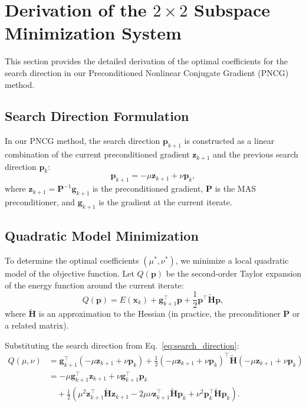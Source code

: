 \documentclass[acmtog,anonymous,review,screen,nonacm]{acmart}
\begin{document}
\section{Derivation of the \texorpdfstring{$2 \times 2$}{2x2} Subspace Minimization System}
\label{sec:subspace_derivation}

This section provides the detailed derivation of the optimal coefficients for the search direction in our Preconditioned Nonlinear Conjugate Gradient (PNCG) method.

\subsection{Search Direction Formulation}
In our PNCG method, the search direction $\mathbf{p}_{k+1}$ is constructed as a linear combination of the current preconditioned gradient $\mathbf{z}_{k+1}$ and the previous search direction $\mathbf{p}_k$:
\begin{equation}
    \mathbf{p}_{k+1} = -\mu \mathbf{z}_{k+1} + \nu \mathbf{p}_k,
    \label{eq:search_direction}
\end{equation}
where $\mathbf{z}_{k+1} = \mathbf{P}^{-1} \mathbf{g}_{k+1}$ is the preconditioned gradient, $\mathbf{P}$ is the MAS preconditioner, and $\mathbf{g}_{k+1}$ is the gradient at the current iterate.

\subsection{Quadratic Model Minimization}
To determine the optimal coefficients $(\mu^*, \nu^*)$, we minimize a local quadratic model of the objective function. Let $Q(\mathbf{p})$ be the second-order Taylor expansion of the energy function around the current iterate:
\begin{equation}
    Q(\mathbf{p}) = E(\mathbf{x}_k) + \mathbf{g}_{k+1}^\top \mathbf{p} + \frac{1}{2} \mathbf{p}^\top \tilde{\mathbf{H}} \mathbf{p},
\end{equation}
where $\tilde{\mathbf{H}}$ is an approximation to the Hessian (in practice, the preconditioner $\mathbf{P}$ or a related matrix).

Substituting the search direction from Eq.~\eqref{eq:search_direction}:
\begin{align}
    Q(\mu, \nu) &= \mathbf{g}_{k+1}^\top (-\mu \mathbf{z}_{k+1} + \nu \mathbf{p}_k) + \frac{1}{2} (-\mu \mathbf{z}_{k+1} + \nu \mathbf{p}_k)^\top \tilde{\mathbf{H}} (-\mu \mathbf{z}_{k+1} + \nu \mathbf{p}_k) \nonumber \\
    &= -\mu \mathbf{g}_{k+1}^\top \mathbf{z}_{k+1} + \nu \mathbf{g}_{k+1}^\top \mathbf{p}_k \nonumber \\
    &\quad + \frac{1}{2} \left( \mu^2 \mathbf{z}_{k+1}^\top \tilde{\mathbf{H}} \mathbf{z}_{k+1} - 2\mu\nu \mathbf{z}_{k+1}^\top \tilde{\mathbf{H}} \mathbf{p}_k + \nu^2 \mathbf{p}_k^\top \tilde{\mathbf{H}} \mathbf{p}_k \right).
\end{align}
\end{document}
